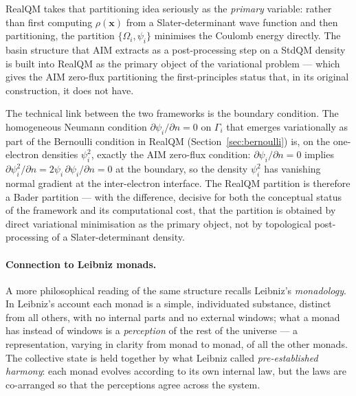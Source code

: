 RealQM takes that partitioning idea seriously as the \emph{primary} variable: rather than first computing $\rho(\mathbf{x})$ from a Slater-determinant wave function and then partitioning, the partition $\{\Omega_i, \psi_i\}$ minimises the Coulomb energy directly. The basin structure that AIM extracts as a post-processing step on a StdQM density is built into RealQM as the primary object of the variational problem --- which gives the AIM zero-flux partitioning the first-principles status that, in its original construction, it does not have.

The technical link between the two frameworks is the boundary condition. The homogeneous Neumann condition $\partial \psi_i / \partial n = 0$ on $\Gamma_i$ that emerges variationally as part of the Bernoulli condition in RealQM (Section~\ref{sec:bernoulli}) is, on the one-electron densities $\psi_i^2$, exactly the AIM zero-flux condition: $\partial \psi_i / \partial n = 0$ implies $\partial \psi_i^2 / \partial n = 2 \psi_i \, \partial \psi_i / \partial n = 0$ at the boundary, so the density $\psi_i^2$ has vanishing normal gradient at the inter-electron interface. The RealQM partition is therefore a Bader partition --- with the difference, decisive for both the conceptual status of the framework and its computational cost, that the partition is obtained by direct variational minimisation as the primary object, not by topological post-processing of a Slater-determinant density.

\paragraph{Connection to Leibniz monads.}
A more philosophical reading of the same structure recalls Leibniz's \emph{monadology}. In Leibniz's account each monad is a simple, individuated substance, distinct from all others, with no internal parts and no external windows; what a monad has instead of windows is a \emph{perception} of the rest of the universe --- a representation, varying in clarity from monad to monad, of all the other monads. The collective state is held together by what Leibniz called \emph{pre-established harmony}: each monad evolves according to its own internal law, but the laws are co-arranged so that the perceptions agree across the system.

